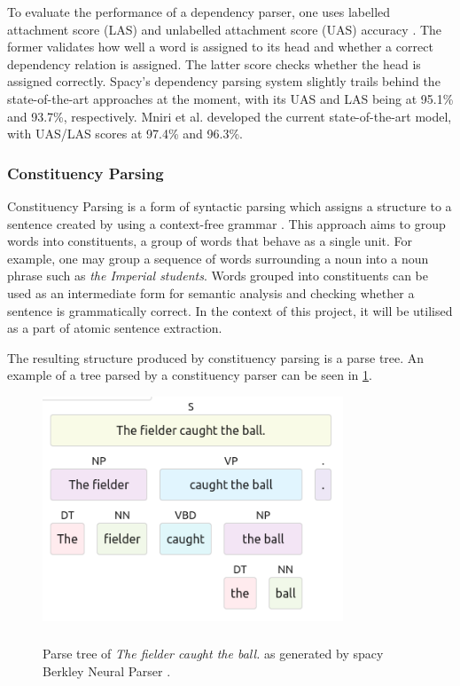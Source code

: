 
To evaluate the performance of a dependency parser, one uses labelled attachment score (LAS) and unlabelled attachment score (UAS) accuracy \cite{RefWorks:RefID:28-jurafsky2014speech}.
The former validates how well a word is assigned to its head and whether a correct dependency relation is assigned.
The latter score checks whether the head is assigned correctly.
Spacy's dependency parsing system slightly trails behind the state-of-the-art approaches at the moment, with its UAS and LAS being at 95.1\% and 93.7\%, respectively. 
Mniri et al. \cite{RefWorks:RefID:29-mrini2019rethinking} developed the current state-of-the-art model, with UAS/LAS scores at 97.4\% and 96.3\%.

\subsubsection{Constituency Parsing}

Constituency Parsing is a form of syntactic parsing which assigns a structure to a sentence created by using a context-free grammar \cite{RefWorks:RefID:28-jurafsky2014speech}.
This approach aims to group words into constituents, a group of words that behave as a single unit.
For example, one may group a sequence of words surrounding a noun into a noun phrase such as \emph{the Imperial students}.
Words grouped into constituents can be used as an intermediate form for semantic analysis and checking whether a sentence is grammatically correct.
In the context of this project, it will be utilised as a part of atomic sentence extraction.


The resulting structure produced by constituency parsing is a parse tree. 
An example of a tree parsed by a constituency parser can be seen in \ref{constituency-graph}.

\begin{figure}[h]
\caption{Parse tree of \emph{The fielder caught the ball.} as generated by spacy Berkley Neural Parser \cite{RefWorks:RefID:26-spacy}.}
\centering
\includegraphics[width=0.8\textwidth]{background/constituency parse.png}
\label{constituency-graph}
\end{figure}

